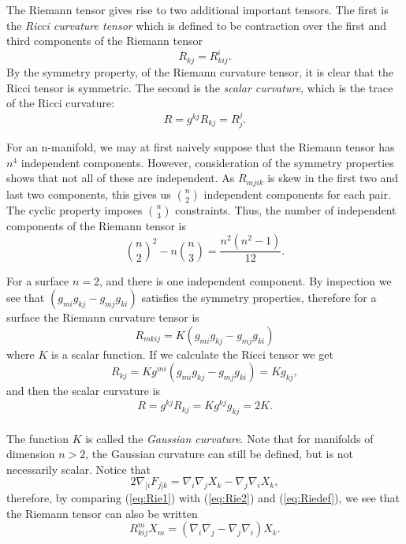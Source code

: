 The Riemann tensor gives rise to two additional important tensors. The first is the \textit{Ricci curvature tensor} which is defined to be contraction over the first and third components of the Riemann tensor
\begin{equation} R_{kj}=R^i_{kij}. \label{Ricci} \end{equation}
By the symmetry property, of the Riemann curvature tensor, it is clear that the Ricci tensor is symmetric. The second is the \textit{scalar curvature}, which is the trace of the Ricci curvature:
\begin{equation} R=g^{kj}R_{kj}=R^j_j. \label{scalarcurv} \end{equation}

For an n-manifold, we may at first naively suppose that the Riemann tensor has $n^4$ independent components. However, consideration of the symmetry properties shows that not all of these are independent. As $R_{mjik}$ is skew in the first two and last two components, this gives us $n\choose2$ independent components for each pair. The cyclic property imposes $n\choose3$ constraints. Thus, the number of independent components of the Riemann tensor is
\begin{equation} 
{n\choose2}^2 -n {n\choose3} =\frac{n^2(n^2-1)}{12}. 
\label{eq:compRie} 
\end{equation}

For a surface $n=2$, and there is one independent component. By inspection we see that $(g_{mi}g_{kj}-g_{mj}g_{ki})$ satisfies the symmetry properties, therefore for a surface the Riemann curvature tensor is 
\begin{equation} R_{mkij}=K(g_{mi}g_{kj}-g_{mj}g_{ki})\label{eq:Riesurface} \end{equation}
where $K$ is a scalar function. If we calculate the Ricci tensor we get
\begin{equation} R_{kj}=Kg^{mi}(g_{mi}g_{kj}-g_{mj}g_{ki})=Kg_{kj}, \label{riccisurface} \end{equation}
and then the scalar curvature is 
\begin{equation} R=g^{kj}R_{kj}=Kg^{kj}g_{kj}=2K. \label{scalarsurf} \end{equation}\\
The function $K$ is called the \textit{Gaussian curvature}. Note that for manifolds of dimension $n>2$, the Gaussian curvature can still be defined, but is not necessarily scalar. Notice that 
\begin{equation} 2\nabla_{[i}F_{j]k}=\nabla_i \nabla_j X_k-\nabla_j \nabla_i X_k, \label{eq:Rie1}\end{equation}
therefore, by comparing (\ref{eq:Rie1}) with (\ref{eq:Rie2}) and (\ref{eq:Riedef}), we see that the Riemann tensor can also be written
\[ R^m_{kij}X_m = (\nabla_i\nabla_j - \nabla_j \nabla_i)X_k.\]

